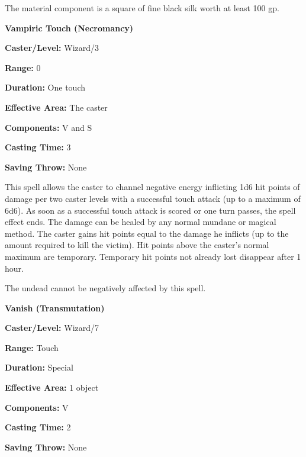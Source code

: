 \begin{multicols}{2}
The material component is a square of fine black silk worth at least 100 gp.

\vspace{1em}

\noindent
\begin{minipage}{\columnwidth}

\noindent \textbf{Vampiric Touch (Necromancy)}

\noindent \textbf{Caster/Level:} Wizard/3

\noindent \textbf{Range:} 0

\noindent \textbf{Duration:} One touch

\noindent \textbf{Effective Area:} The caster

\noindent \textbf{Components:} V and S

\noindent \textbf{Casting Time:} 3

\noindent \textbf{Saving Throw:} None

\end{minipage}

This spell allows the caster to channel negative energy inflicting 1d6 hit points of damage per two caster levels with a successful touch attack (up to a maximum of 6d6).  As soon as a successful touch attack is scored or one turn passes, the spell effect ends.  The damage can be healed by any normal mundane or magical method.  The caster gains hit points equal to the damage he inflicts (up to the amount required to kill the victim).  Hit points above the caster's normal maximum are temporary.  Temporary hit points not already lost disappear after 1 hour.

The undead cannot be negatively affected by this spell.

\vspace{1em}

\noindent
\begin{minipage}{\columnwidth}

\noindent \textbf{Vanish (Transmutation)}

\noindent \textbf{Caster/Level:} Wizard/7

\noindent \textbf{Range:} Touch

\noindent \textbf{Duration:} Special

\noindent \textbf{Effective Area:} 1 object

\noindent \textbf{Components:} V

\noindent \textbf{Casting Time:} 2

\noindent \textbf{Saving Throw:} None


\end{minipage}
\end{multicols}
